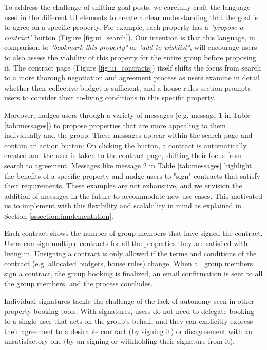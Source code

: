 To address the challenge of shifting goal posts, we carefully craft the language used in the different UI elements to create a clear understanding that the goal is to agree on a specific property. For example, each property has a \textit{"propose a contract"} button (Figure \ref{fig:ui_search}). Our intention is that this language, in comparison to \textit{"bookmark this property"} or \textit{"add to wishlist"}, will encourage users to also assess the viability of this property for the entire group before proposing it. The contract page (Figure \ref{fig:ui_contracts}) itself shifts the focus from search to a more thorough negotiation and agreement process as users examine in detail whether their collective budget is sufficient, and a house rules section prompts users to consider their co-living conditions in this specific property.

Moreover, \cbot nudges users through a variety of messages (e.g. message 1 in Table \ref{tab:messages}) to propose properties that are more appealing to them individually and the group. These messages appear within the search page and contain an action button: On clicking the button, a contract is automatically created and the user is taken to the contract page, shifting their focus from search to agreement. Messages like message 2 in Table \ref{tab:messages} highlight the benefits of a specific property and nudge users to "sign" contracts that satisfy their requirements. These examples are not exhaustive, and we envision the addition of \cbot messages in the future to accommodate new use cases. This motivated us to implement \tool with this flexibility and scalability in mind as explained in Section \ref{sssection:implementation}.



Each contract shows the number of group members that have signed the contract. Users can sign multiple contracts for all the properties they are satisfied with living in. Unsigning a contract is only allowed if the terms and conditions of the contract (e.g. allocated budgets, house rules) change. When all group members sign a contract, the group booking is finalized, an email confirmation is sent to all the group members, and the process concludes. 

Individual signatures tackle the challenge of the lack of autonomy seen in other property-booking tools. With signatures, users do not need to delegate booking to a single user that acts on the group's behalf, and they can explicitly express their agreement to a desirable contract (by signing it) or disagreement with an unsatisfactory one (by un-signing or withholding their signature from it).


